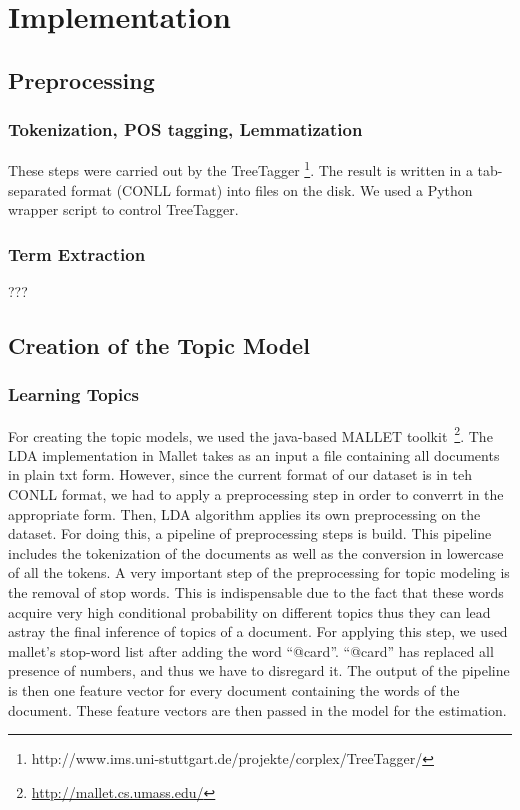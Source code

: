 \documentclass[11pt, a4paper, abstraction]{scrartcl}
\begin{document}
\section{Implementation}
\label{sec:implementation}

\subsection{Preprocessing}

\subsubsection{Tokenization, POS tagging, Lemmatization}
These steps were carried out by the TreeTagger \footnote{http://www.ims.uni-stuttgart.de/projekte/corplex/TreeTagger/}. The result is written in a tab-separated format (CONLL format) into files on the disk. We used a Python wrapper script to control TreeTagger.

\subsubsection{Term Extraction}

???

\subsection{Creation of the Topic Model}

\subsubsection{Learning Topics}
For creating the topic models, we used the java-based MALLET toolkit~\footnote{\url{http://mallet.cs.umass.edu/}}. 
The LDA implementation in Mallet takes as an input a file containing all documents in plain txt form. However, since the current format of our dataset is in teh CONLL format, we had to apply a preprocessing step in order to converrt in the appropriate form.
Then, LDA algorithm applies its own preprocessing on the dataset. For doing this, a pipeline of preprocessing steps is build. This pipeline includes the tokenization of the documents as well as the conversion in lowercase of all the tokens.
A very important step of the preprocessing for topic modeling is the removal of stop words. This is indispensable due to the fact that these words acquire very high conditional probability on different topics thus they can lead astray the final inference of topics of a document. For applying this step, we used mallet's stop-word list after adding the word ``@card''. ``@card'' has replaced all presence of numbers, and thus we have to disregard it.
The output of the pipeline is then one feature vector for every document containing the words of the document.
These feature vectors are then passed in the model for the estimation. 
\end{document}
